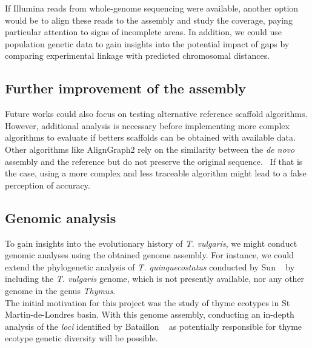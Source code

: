 If Illumina reads from whole-genome sequencing were available, another option would be to align these reads to the assembly and study the coverage, paying particular attention to signs of incomplete areas. In addition, we could use population genetic data to gain insights into the potential impact of gaps by comparing experimental linkage with predicted chromosomal distances.\\

\subsection*{Further improvement of the assembly}

Future works could also focus on testing alternative reference scaffold algorithms. However, additional analysis is necessary before implementing more complex algorithms to evaluate if betters scaffolds can be obtained with available data. \\

Other algorithms like AlignGraph2 rely on the similarity between the \textit{de novo} assembly and the reference but do not preserve the original sequence.~\cite{huangAlignGraph2SimilarGenomeassisted2021} If that is the case, using a more complex and less traceable algorithm might lead to a false perception of accuracy. \\


\subsection*{Genomic analysis}

To gain insights into the evolutionary history of \textit{T. vulgaris}, we might conduct genomic analyses using the obtained genome assembly. For instance, we could extend the phylogenetic analysis of \textit{T. quinquecostatus} conducted by Sun \etal~\cite{sunChromosomelevelAssemblyAnalysis2022} by including the \textit{T. vulgaris} genome, which is not presently available, nor any other genome in the genus \textit{Thymus}. \\

The initial motivation for this project was the study of thyme ecotypes in St Martin-de-Londres basin. With this genome assembly, conducting an in-depth analysis of the  \textit{loci} identified by Bataillon \etal~\cite{bataillonGenotypePhenotypeGenetic2022} as potentially responsible for thyme ecotype genetic diversity will be possible.\\

